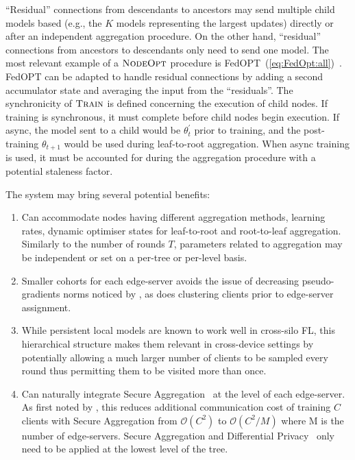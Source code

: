 ``Residual'' connections from descendants to ancestors may send multiple child models based (e.g., the $K$ models representing the largest updates) directly or after an independent aggregation procedure. On the other hand, ``residual'' connections from ancestors to descendants only need to send one model. The most relevant example of a $\textsc{NodeOpt}$ procedure is FedOPT~(\cref{eq:FedOpt:all})~\citep{FedOPT}. FedOPT can be adapted to handle residual connections by adding a second accumulator state and averaging the input from the ``residuals''. The synchronicity of $\textsc{Train}$ is defined concerning the execution of child nodes. If training is synchronous, it must complete before child nodes begin execution. If async, the model sent to a child would be $\theta_{t}^\prime$ prior to training, and the post-training $\theta_{t+1}$ would be used during leaf-to-root aggregation. When async training is used, it must be accounted for during the aggregation procedure with a potential staleness factor.

The system may bring several potential benefits:
\begin{enumerate}
    \item Can accommodate nodes having different aggregation methods, learning rates, dynamic optimiser states for leaf-to-root and root-to-leaf aggregation. Similarly to the number of rounds $T$, parameters related to aggregation may be independent or set on a per-tree or per-level basis.
    \item Smaller cohorts for each edge-server avoids the issue of decreasing pseudo-gradients norms noticed by \citet{LargeCohorts}, as does clustering clients prior to edge-server assignment.
    \item While persistent local models are known to work well in cross-silo FL, this hierarchical structure makes them relevant in cross-device settings by potentially allowing a much larger number of clients to be sampled every round thus permitting them to be visited more than once.
    \item Can naturally integrate Secure Aggregation~\citep{SecAggOG,FastSecAgg} at the level of each edge-server. As first noted by \citet{ScaleSystemDesign}, this reduces additional communication cost of training $C$ clients with Secure Aggregation from $\mathcal{O}(C^2)$ to $\mathcal{O}(C^2/M)$ where M is the number of edge-servers. Secure Aggregation and Differential Privacy~\citep{DiffPrivacyFL} only need to be applied at the lowest level of the tree.

\end{enumerate}


